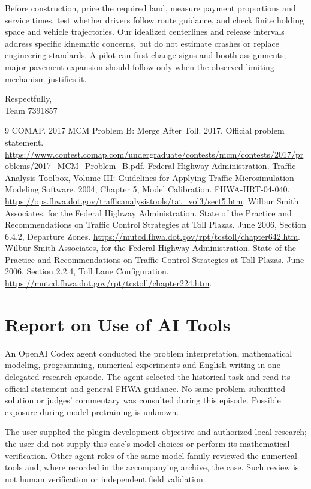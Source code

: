 \documentclass[12pt,letterpaper]{article}
\begin{document}
Before construction, price the required land, measure payment proportions and service times, test whether drivers follow route guidance, and check finite holding space and vehicle trajectories. Our idealized centerlines and release intervals address specific kinematic concerns, but do not estimate crashes or replace engineering standards. A pilot can first change signs and booth assignments; major pavement expansion should follow only when the observed limiting mechanism justifies it.

\noindent Respectfully,\\Team 7391857
\clearpage
\begin{thebibliography}{9}
 COMAP. 2017 MCM Problem B: Merge After Toll. 2017. Official problem statement.
\url{https://www.contest.comap.com/undergraduate/contests/mcm/contests/2017/problems/2017_MCM_Problem_B.pdf}.
 Federal Highway Administration. Traffic Analysis Toolbox, Volume III: Guidelines for Applying Traffic Microsimulation Modeling Software. 2004, Chapter 5, Model Calibration. FHWA-HRT-04-040.
\url{https://ops.fhwa.dot.gov/trafficanalysistools/tat_vol3/sect5.htm}.
 Wilbur Smith Associates, for the Federal Highway Administration. State of the Practice and Recommendations on Traffic Control Strategies at Toll Plazas. June 2006, Section 6.4.2, Departure Zones.
\url{https://mutcd.fhwa.dot.gov/rpt/tcstoll/chapter642.htm}.
 Wilbur Smith Associates, for the Federal Highway Administration. State of the Practice and Recommendations on Traffic Control Strategies at Toll Plazas. June 2006, Section 2.2.4, Toll Lane Configuration.
\url{https://mutcd.fhwa.dot.gov/rpt/tcstoll/chapter224.htm}.
\end{thebibliography}
\clearpage\section*{Report on Use of AI Tools}
An OpenAI Codex agent conducted the problem interpretation, mathematical modeling, programming, numerical experiments and English writing in one delegated research episode. The agent selected the historical task and read its official statement and general FHWA guidance. No same-problem submitted solution or judges' commentary was consulted during this episode. Possible exposure during model pretraining is unknown.

The user supplied the plugin-development objective and authorized local research; the user did not supply this case's model choices or perform its mathematical verification. Other agent roles of the same model family reviewed the numerical tools and, where recorded in the accompanying archive, the case. Such review is not human verification or independent field validation.
\end{document}
